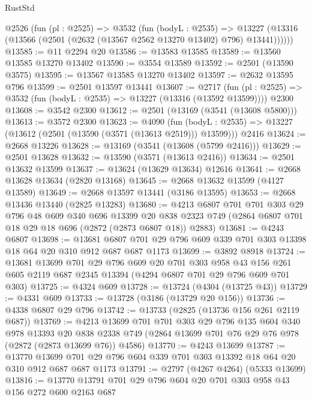 \begin{lexlean}{RustStd}
\begin{coremodule}
    @2526
      (fun (pl : @2525) =>
      @3532
        (fun (bodyL : @2535) =>
        @13227 (@13316 (@13566 (@2501 (@2632 (@13567 @2562 @13270 @13402) @796) @13441))))))
@13585 := @11 @2294 @20
@13586 := @13583 @13585
@13589 := @13560 @13585 @13270 @13402
@13590 := @3554 @13589
@13592 := @2501 (@13590 @3575)
@13595 := @13567 @13585 @13270 @13402
@13597 := @2632 @13595 @796
@13599 := @2501 @13597 @13441
@13607 := @2717
    (fun (pl : @2525) => @3532 (fun (bodyL : @2535) => @13227 (@13316 (@13592 @13599))))
    @2300
@13608 := @3542 @2300
@13612 := @2501 (@13169 (@3541 (@13608 @5800)))
@13613 := @3572 @2300
@13623 := @4090
    (fun (bodyL : @2535) => @13227 (@13612 (@2501 (@13590 (@3571 (@13613 @2519))) @13599)))
    @2416
@13624 := @2668 @13226
@13628 := @13169 (@3541 (@13608 (@5799 @2416)))
@13629 := @2501 @13628
@13632 := @13590 (@3571 (@13613 @2416))
@13634 := @2501 @13632 @13599
@13637 := @13624 (@13629 @13634) @12616
@13641 := @2668 @13628 @13634 (@2820 @13168)
@13645 := @2668 @13632 @13599 (@4127 @13589)
@13649 := @2668 @13597 @13441 (@3186 @13595)
@13653 := @2668 @13436 @13440 (@2825 @13283)
@13680 := @4213
    @6807
    @701
    @701
    @303
    @29
    @796
    @48
    @609
    @340
    @696
    @13399
    @20
    @838
    @2323
    @749
    (@2864 @6807 @701 @18 @29 @18 @696 (@2872 (@2873 @6807 @18)) @2883)
@13681 := @4243 @6807
@13698 := @13681
    @6807
    @701
    @29
    @796
    @609
    @339
    @701
    @303
    @13398
    @18
    @64
    @20
    @310
    @912
    @687
    @687
    @1173
@13699 := @3892 @8918
@13724 := @13681
    @13699
    @701
    @29
    @796
    @609
    @20
    @701
    @303
    @958
    @43
    @156
    @261
    @605
    @2119
    @687
    @2345
    @13394
    (@4294 @6807 @701 @29 @796 @609 @701 @303)
@13725 := @4324 @609
@13728 := @13724 (@4304 (@13725 @43))
@13729 := @4331 @609
@13733 := @13728 (@3186 (@13729 @20 @156))
@13736 := @4338 @6807 @29 @796
@13742 := @13733 (@2825 (@13736 @156 @261 @2119 @687))
@13769 := @4213
    @13699
    @701
    @701
    @303
    @29
    @796
    @135
    @604
    @340
    @978
    @13393
    @20
    @838
    @2338
    @749
    (@2864 @13699 @701 @76 @29 @76 @978 (@2872 (@2873 @13699 @76)) @4586)
@13770 := @4243 @13699
@13787 := @13770
    @13699
    @701
    @29
    @796
    @604
    @339
    @701
    @303
    @13392
    @18
    @64
    @20
    @310
    @912
    @687
    @687
    @1173
@13791 := @2797 (@4267 @4264) (@5333 @13699)
@13816 := @13770
    @13791
    @701
    @29
    @796
    @604
    @20
    @701
    @303
    @958
    @43
    @156
    @272
    @600
    @2163
    @687

\end{coremodule}
\end{lexlean}
